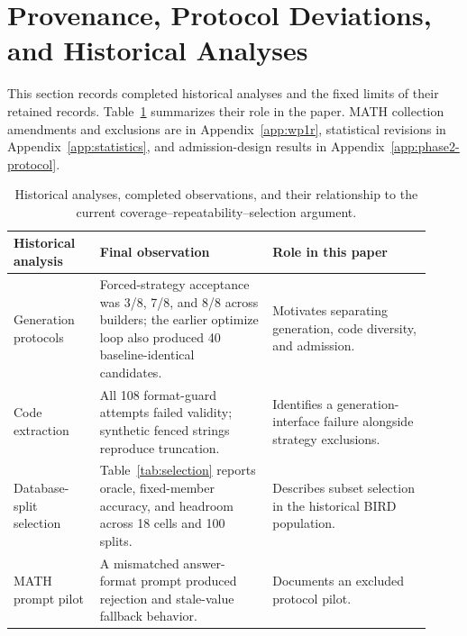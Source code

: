 \section{Provenance, Protocol Deviations, and Historical Analyses}\label{app:history}
This section records completed historical analyses and the fixed
limits of their retained records. Table~\ref{tab:history-map} summarizes
their role in the paper. MATH collection amendments and exclusions are
in Appendix~\ref{app:wp1r}, statistical revisions in
Appendix~\ref{app:statistics}, and admission-design results in
Appendix~\ref{app:phase2-protocol}.

\begin{table}[H]
\centering\small
\begin{tabular}{@{}p{0.19\linewidth}p{0.38\linewidth}p{0.35\linewidth}@{}}
\toprule
Historical analysis & Final observation & Role in this paper \\
\midrule
Generation protocols & Forced-strategy acceptance was 3/8, 7/8, and 8/8 across builders; the earlier optimize loop also produced 40 baseline-identical candidates. & Motivates separating generation, code diversity, and admission. \\
Code extraction & All 108 format-guard attempts failed validity; synthetic fenced strings reproduce truncation. & Identifies a generation-interface failure alongside strategy exclusions. \\
Database-split selection & Table~\ref{tab:selection} reports oracle, fixed-member accuracy, and headroom across 18 cells and 100 splits. & Describes subset selection in the historical BIRD population. \\
MATH prompt pilot & A mismatched answer-format prompt produced rejection and stale-value fallback behavior. & Documents an excluded protocol pilot. \\
\bottomrule
\end{tabular}
\caption{Historical analyses, completed observations, and their relationship to the current coverage--repeatability--selection argument.}
\label{tab:history-map}
\end{table}
